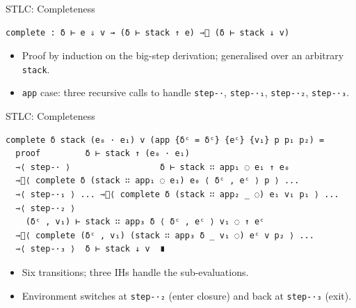 \documentclass[10pt,compress,aspectratio=169]{beamer}
\begin{document}


\begin{frame}[fragile]{STLC: Completeness}
\begin{verbatim}
complete : δ ⊢ e ⇓ v → (δ ⊢ stack ↑ e) ⇾⃰ (δ ⊢ stack ↓ v)
\end{verbatim}
\begin{itemize}
    \item Proof by induction on the big-step derivation; generalised over an arbitrary \texttt{stack}.
    \item \texttt{app} case: three recursive calls to handle \texttt{step-·}, \texttt{step-·₁}, \texttt{step-·₂}, \texttt{step-·₃}.
\end{itemize}
\end{frame}

\begin{frame}[fragile]{STLC: Completeness}
\begin{verbatim}
complete δ stack (e₀ · e₁) v (app {δᶜ = δᶜ} {eᶜ} {v₁} p p₁ p₂) =
  proof         δ ⊢ stack ↑ (e₀ · e₁)
  ⇾⟨ step-· ⟩                  δ ⊢ stack ∷ app₁ ◌ e₁ ↑ e₀
  ⇾⃰⟨ complete δ (stack ∷ app₁ ◌ e₁) e₀ ⟨ δᶜ , eᶜ ⟩ p ⟩ ...
  ⇾⟨ step-·₁ ⟩ ... ⇾⃰⟨ complete δ (stack ∷ app₂ _ ◌) e₁ v₁ p₁ ⟩ ...
  ⇾⟨ step-·₂ ⟩
    (δᶜ , v₁) ⊢ stack ∷ app₃ δ ⟨ δᶜ , eᶜ ⟩ v₁ ◌ ↑ eᶜ
  ⇾⃰⟨ complete (δᶜ , v₁) (stack ∷ app₃ δ _ v₁ ◌) eᶜ v p₂ ⟩ ...
  ⇾⟨ step-·₃ ⟩  δ ⊢ stack ↓ v  ∎
\end{verbatim}
\begin{itemize}
    \item Six transitions; three IHs handle the sub-evaluations.
    \item Environment switches at \texttt{step-·₂} (enter closure) and back at \texttt{step-·₃} (exit).
\end{itemize}
\end{frame}
\end{document}

